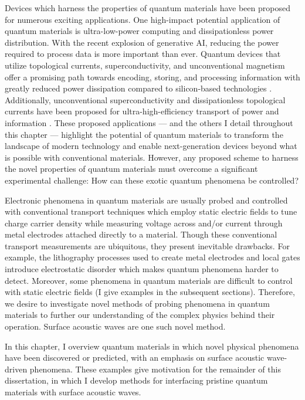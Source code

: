 \documentclass{beavtex_dub_edit}
\begin{document}
Devices which harness the properties of quantum materials have been proposed for numerous exciting applications. One high-impact potential application of quantum materials is ultra-low-power computing and dissipationless power distribution. With the recent explosion of generative AI, reducing the power required to process data is more important than ever. Quantum devices that utilize topological currents, superconductivity, and unconventional magnetism offer a promising path towards encoding, storing, and processing information with greatly reduced power dissipation compared to silicon-based technologies \cite{tokura_emergent_2017,hoffmann_quantum_2022,broholm_basic_2016}. Additionally, unconventional superconductivity and dissipationless topological currents have been proposed for ultra-high-efficiency transport of power and information \cite{broholm_basic_2016}. These proposed applications — and the others I detail throughout this chapter — highlight the potential of quantum materials to transform the landscape of modern technology and enable next-generation devices beyond what is possible with conventional materials. However, any proposed scheme to harness the novel properties of quantum materials must overcome a significant experimental challenge: How can these exotic quantum phenomena be controlled?

Electronic phenomena in quantum materials are usually probed and controlled with conventional transport techniques which employ static electric fields to tune charge carrier density while measuring voltage across and/or current through metal electrodes attached directly to a material. Though these conventional transport measurements are ubiquitous, they present inevitable drawbacks. For example, the lithography processes used to create metal electrodes and local gates introduce electrostatic disorder which makes quantum phenomena harder to detect. Moreover, some phenomena in quantum materials are difficult to control with static electric fields (I give examples in the subsequent sections). Therefore, we desire to investigate novel methods of probing phenomena in quantum materials to further our understanding of the complex physics behind their operation. Surface acoustic waves are one such novel method. 

In this chapter, I overview quantum materials in which novel physical phenomena have been discovered or predicted, with an emphasis on surface acoustic wave-driven phenomena. These examples give motivation for the remainder of this dissertation, in which I develop methods for interfacing pristine quantum materials with surface acoustic waves.
\end{document}

